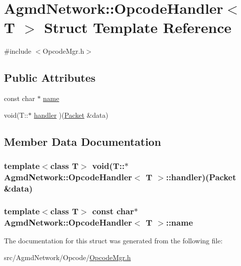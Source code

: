 \hypertarget{struct_agmd_network_1_1_opcode_handler}{\section{Agmd\+Network\+:\+:Opcode\+Handler$<$ T $>$ Struct Template Reference}
\label{struct_agmd_network_1_1_opcode_handler}
}


{\ttfamily \#include $<$Opcode\+Mgr.\+h$>$}

\subsection*{Public Attributes}
\begin{DoxyCompactItemize}
\item 
const char $\ast$ \hyperlink{struct_agmd_network_1_1_opcode_handler_a67ffca134c30ffb7db346e9aff050e64}{name}
\item 
void(T\+::$\ast$ \hyperlink{struct_agmd_network_1_1_opcode_handler_a58c587d5b0055278c71e765ab0c4bbd9}{handler} )(\hyperlink{class_agmd_network_1_1_packet}{Packet} \&data)
\end{DoxyCompactItemize}


\subsection{Member Data Documentation}
\hypertarget{struct_agmd_network_1_1_opcode_handler_a58c587d5b0055278c71e765ab0c4bbd9}{
\subsubsection[{handler}]{\setlength{\rightskip}{0pt plus 5cm}template$<$class T$>$ void(T\+::$\ast$ {\bf Agmd\+Network\+::\+Opcode\+Handler}$<$ T $>$\+::handler)({\bf Packet} \&data)}}\label{struct_agmd_network_1_1_opcode_handler_a58c587d5b0055278c71e765ab0c4bbd9}
\hypertarget{struct_agmd_network_1_1_opcode_handler_a67ffca134c30ffb7db346e9aff050e64}{
\subsubsection[{name}]{\setlength{\rightskip}{0pt plus 5cm}template$<$class T$>$ const char$\ast$ {\bf Agmd\+Network\+::\+Opcode\+Handler}$<$ T $>$\+::name}}\label{struct_agmd_network_1_1_opcode_handler_a67ffca134c30ffb7db346e9aff050e64}


The documentation for this struct was generated from the following file\+:\begin{DoxyCompactItemize}
\item 
src/\+Agmd\+Network/\+Opcode/\hyperlink{_opcode_mgr_8h}{Opcode\+Mgr.\+h}\end{DoxyCompactItemize}
